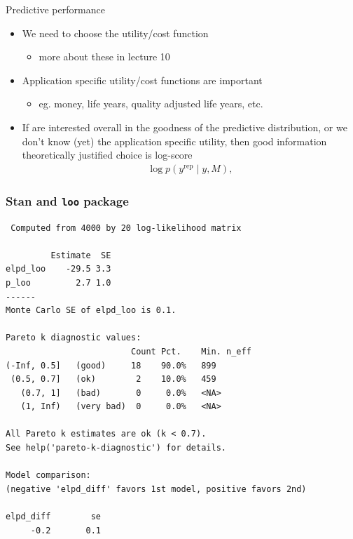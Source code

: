 \documentclass[english,t]{beamer}
\begin{document}
\begin{frame}{Predictive performance}

  \begin{itemize}
  \item We need to choose the utility/cost function
    \begin{itemize}
    \item more about these in lecture 10
    \end{itemize}
  \item Application specific utility/cost functions are important
    \begin{itemize}
      \item eg. money, life years, quality adjusted life years, etc.
    \end{itemize}
    \pause
  \item If are interested overall in the goodness of the predictive distribution,
    or we don't know (yet) the application specific utility, then
    good information theoretically justified choice is log-score
      \begin{align*}
        \log p(y^{\text{rep}}  \mid  y, M),
      \end{align*}
\end{itemize}

\end{frame}

\begin{frame}[fragile]
  \frametitle{Stan and {\tt loo} package}

  {\scriptsize
\begin{lstlisting}
 Computed from 4000 by 20 log-likelihood matrix

         Estimate  SE
elpd_loo    -29.5 3.3
p_loo         2.7 1.0
------
Monte Carlo SE of elpd_loo is 0.1.

Pareto k diagnostic values:
                         Count Pct.    Min. n_eff
(-Inf, 0.5]   (good)     18    90.0%   899       
 (0.5, 0.7]   (ok)        2    10.0%   459       
   (0.7, 1]   (bad)       0     0.0%   <NA>      
   (1, Inf)   (very bad)  0     0.0%   <NA>      

All Pareto k estimates are ok (k < 0.7).
See help('pareto-k-diagnostic') for details.

Model comparison: 
(negative 'elpd_diff' favors 1st model, positive favors 2nd) 

elpd_diff        se 
     -0.2       0.1 
\end{lstlisting}
}

\end{frame}
\end{document}
